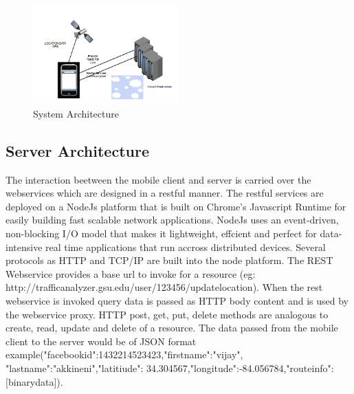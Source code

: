 \documentclass[10pt]{sigplan-proc-varsize}
\begin{document}
\begin{figure}[h!]
  \caption{System Architecture}
  \centering
    \includegraphics[width=0.5\textwidth]{Traffic_Analyzer}
\end{figure}


\subsection{Server Architecture}

 The interaction beetween the mobile client and server is carried over the webservices which are designed in a restful manner.  The restful services are deployed on a NodeJs platform that is built on Chrome's Javascript Runtime for easily building fast scalable network applications. NodeJs uses an event-driven, non-blocking I/O model that makes it lightweight, effcient and perfect for data-intensive real time applications that run accross distributed devices. Several protocols as HTTP and TCP/IP are built into the node platform. The REST Webservice provides a base url to invoke for a resource (eg: http://trafficanalyzer.gsu.edu/user/123456/updatelocation). When the rest webservice is invoked query data is passed as HTTP body content and is used by the webservice proxy. HTTP post, get, put, delete methods are analogous to create, read, update and delete of a resource. The data passed from the mobile client to the server would be of JSON format example({"facebookid":1432214523423,"firstname":"vijay",
"lastname":"akkineni","latitiude": 34.304567,"longitude":-84.056784,"routeinfo":[binarydata]}).
 
\end{document}
